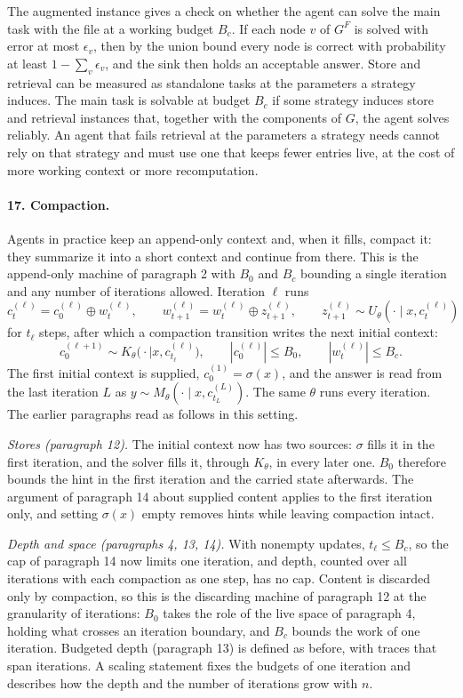 \documentclass[11pt]{article}
\begin{document}
The augmented instance gives a check on whether the agent can solve the
main task with the file at a working budget $B_c$. If each node $v$ of
$G^F$ is solved with error at most $\epsilon_v$, then by the union bound
every node is correct with probability at least $1-\sum_v\epsilon_v$,
and the sink then holds an acceptable answer. Store and retrieval can be
measured as standalone tasks at the parameters a strategy induces. The
main task is solvable at budget $B_c$ if some strategy induces store and
retrieval instances that, together with the components of $G$, the
agent solves reliably. An agent that fails retrieval at the parameters a
strategy needs cannot rely on that strategy and must use one that keeps
fewer entries live, at the cost of more working context or more
recomputation.

\paragraph{17. Compaction.}
Agents in practice keep an append-only context and, when it fills,
compact it: they summarize it into a short context and continue from
there. This is the append-only machine of paragraph 2 with $B_0$ and
$B_c$ bounding a single iteration and any number of iterations allowed.
Iteration $\ell$ runs
\[
c^{(\ell)}_t=c^{(\ell)}_0\oplus w^{(\ell)}_t,
\qquad
w^{(\ell)}_{t+1}=w^{(\ell)}_t\oplus z^{(\ell)}_{t+1},
\qquad
z^{(\ell)}_{t+1}\sim U_\theta(\cdot\mid x,c^{(\ell)}_t)
\]
for $t_\ell$ steps, after which a compaction transition writes the next
initial context:
\[
c^{(\ell+1)}_0\sim K_\theta\big(\cdot\mid x,c^{(\ell)}_{t_\ell}\big),
\qquad
|c^{(\ell)}_0|\leq B_0,
\qquad
|w^{(\ell)}_t|\leq B_c.
\]
The first initial context is supplied, $c^{(1)}_0=\sigma(x)$, and the
answer is read from the last iteration $L$ as
$y\sim M_\theta(\cdot\mid x,c^{(L)}_{t_L})$. The same $\theta$ runs every
iteration. The earlier paragraphs read as follows in this setting.

\emph{Stores (paragraph 12).} The initial context now has two sources:
$\sigma$ fills it in the first iteration, and the solver fills it,
through $K_\theta$, in every later one. $B_0$ therefore bounds the hint
in the first iteration and the carried state afterwards. The argument of
paragraph 14 about supplied content applies to the first iteration only,
and setting $\sigma(x)$ empty removes hints while leaving compaction
intact.

\emph{Depth and space (paragraphs 4, 13, 14).} With nonempty updates,
$t_\ell\leq B_c$, so the cap of paragraph 14 now limits one iteration,
and depth, counted over all iterations with each compaction as one
step, has no cap. Content is discarded only by compaction, so this is
the discarding machine of paragraph 12 at the granularity of
iterations: $B_0$ takes the role of the live space of paragraph 4,
holding what crosses an iteration boundary, and $B_c$ bounds the work of
one iteration. Budgeted depth (paragraph 13) is defined as before, with
traces that span iterations. A scaling statement fixes the budgets of
one iteration and describes how the depth and the number of iterations
grow with $n$.
\end{document}
